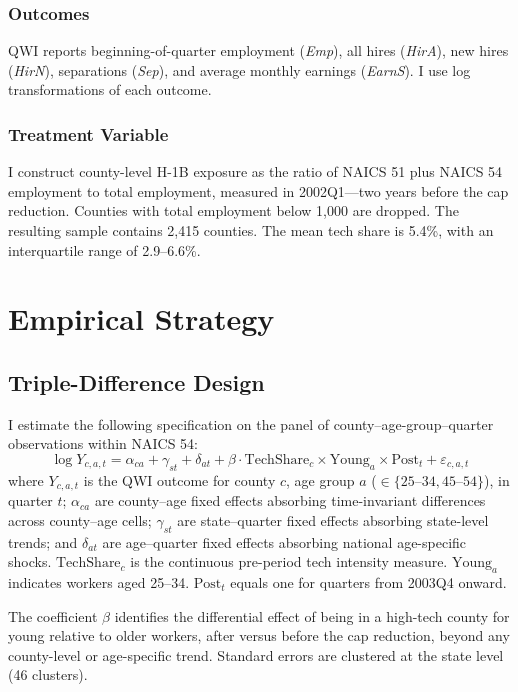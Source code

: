 \documentclass[12pt]{article}
\begin{document}
\subsubsection*{Outcomes} QWI reports beginning-of-quarter employment (\textit{Emp}), all hires (\textit{HirA}), new hires (\textit{HirN}), separations (\textit{Sep}), and average monthly earnings (\textit{EarnS}). I use log transformations of each outcome.

\subsubsection*{Treatment Variable} I construct county-level H-1B exposure as the ratio of NAICS 51 plus NAICS 54 employment to total employment, measured in 2002Q1---two years before the cap reduction. Counties with total employment below 1,000 are dropped. The resulting sample contains 2,415 counties. The mean tech share is 5.4\%, with an interquartile range of 2.9--6.6\%.



\section{Empirical Strategy}

\subsection{Triple-Difference Design}

I estimate the following specification on the panel of county--age-group--quarter observations within NAICS 54:
\begin{equation}
\log Y_{c,a,t} = \alpha_{ca} + \gamma_{st} + \delta_{at} + \beta \cdot \text{TechShare}_c \times \text{Young}_a \times \text{Post}_t + \varepsilon_{c,a,t}
\label{eq:ddd}
\end{equation}
where $Y_{c,a,t}$ is the QWI outcome for county $c$, age group $a$ ($\in \{25\text{--}34, 45\text{--}54\}$), in quarter $t$; $\alpha_{ca}$ are county--age fixed effects absorbing time-invariant differences across county--age cells; $\gamma_{st}$ are state--quarter fixed effects absorbing state-level trends; and $\delta_{at}$ are age--quarter fixed effects absorbing national age-specific shocks. $\text{TechShare}_c$ is the continuous pre-period tech intensity measure. $\text{Young}_a$ indicates workers aged 25--34. $\text{Post}_t$ equals one for quarters from 2003Q4 onward.

The coefficient $\beta$ identifies the differential effect of being in a high-tech county for young relative to older workers, after versus before the cap reduction, beyond any county-level or age-specific trend. Standard errors are clustered at the state level (46 clusters).
\end{document}
